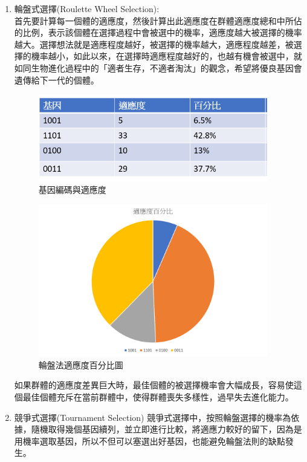          \begin{enumerate}
        \item 
       輪盤式選擇(Roulette Wheel Selection):\\
       首先要計算每一個體的適應度，然後計算出此適應度在群體適應度總和中所佔的比例，表示該個體在選擇過程中會被選中的機率，適應度越大被選擇的機率越大。選擇想法就是適應程度越好，被選擇的機率越大，適應程度越差，被選擇的機率越小，如此以來，在選擇時適應程度越好的，也越有機會被選中，就如同生物進化過程中的「適者生存，不適者淘汰」的觀念，希望將優良基因會遺傳給下一代的個體。
                \begin{figure}[H]
            \centerline{\includegraphics[width=10cm]{pic/Wheel.PNG}}
            \caption{基因編碼與適應度}
            \label{fig:GeneEncodeAndFitness}
        \end{figure}
                 \begin{figure}[H]
            \centerline{\includegraphics[width=10cm]{pic/wheelFitness.png}}
            \caption{輪盤法適應度百分比圖}
            \label{fig:WheelMethodPercentage}
        \end{figure}
        如果群體的適應度差異巨大時，最佳個體的被選擇機率會大幅成長，容易使這個最佳個體充斥在當前群體中，使得群體喪失多樣性，過早失去進化能力。
       
       \item  
       競爭式選擇(Tournament Selection) 
        競爭式選擇中，按照輪盤選擇的機率為依據，隨機取得幾個基因續列，並立即進行比較，將適應力較好的留下，因為是用機率選取基因，所以不但可以塞選出好基因，也能避免輪盤法則的缺點發生。
        \end{enumerate}

